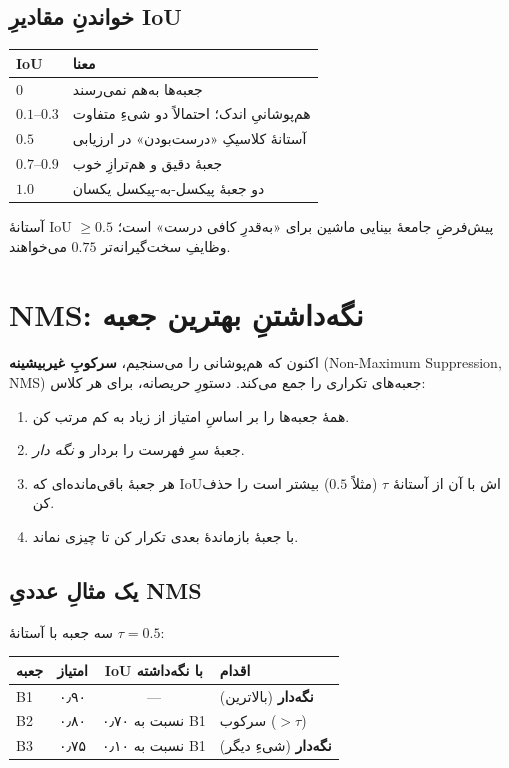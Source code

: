 \documentclass[12pt,a4paper]{article}
\begin{document}
\subsection{خواندنِ مقادیرِ IoU}

\begin{center}
\begin{tabular}{@{}ll@{}}
\hline
\textbf{IoU} & \textbf{معنا} \\
\hline
$0$          & جعبه‌ها به‌هم نمی‌رسند \\
$0.1$--$0.3$ & هم‌پوشانیِ اندک؛ احتمالاً دو شیءِ متفاوت \\
$0.5$        & آستانهٔ کلاسیکِ «درست‌بودن» در ارزیابی \\
$0.7$--$0.9$ & جعبهٔ دقیق و هم‌ترازِ خوب \\
$1.0$        & دو جعبهٔ پیکسل-به-پیکسل یکسان \\
\hline
\end{tabular}
\end{center}

آستانهٔ IoU $\ge 0.5$ پیش‌فرضِ جامعهٔ بینایی ماشین برای «به‌قدرِ کافی درست» است؛ وظایفِ سخت‌گیرانه‌تر $0.75$ می‌خواهند.

\section{NMS: نگه‌داشتنِ بهترین جعبه}

اکنون که هم‌پوشانی را می‌سنجیم، \textbf{سرکوبِ غیربیشینه} (Non-Maximum Suppression, NMS) جعبه‌های تکراری را جمع می‌کند. دستورِ حریصانه، برای هر کلاس:

\begin{enumerate}
  \item همهٔ جعبه‌ها را بر اساسِ امتیاز از زیاد به کم مرتب کن.
  \item جعبهٔ سرِ فهرست را بردار و \emph{نگه دار}.
  \item هر جعبهٔ باقی‌مانده‌ای که IoUاش با آن از آستانهٔ $\tau$ (مثلاً $0.5$) بیشتر است را حذف کن.
  \item با جعبهٔ بازماندهٔ بعدی تکرار کن تا چیزی نماند.
\end{enumerate}

\subsection{یک مثالِ عددیِ NMS}

سه جعبه با آستانهٔ $\tau=0.5$:

\begin{center}
\begin{tabular}{@{}lccl@{}}
\hline
\textbf{جعبه} & \textbf{امتیاز} & \textbf{IoU با نگه‌داشته} & \textbf{اقدام} \\
\hline
B1 & ۰٫۹۰ & --- & \textbf{نگه‌دار} (بالاترین) \\
B2 & ۰٫۸۰ & ۰٫۷۰ نسبت به B1 & سرکوب ($>\tau$) \\
B3 & ۰٫۷۵ & ۰٫۱۰ نسبت به B1 & \textbf{نگه‌دار} (شیءِ دیگر) \\
\hline
\end{tabular}
\end{center}
\end{document}
